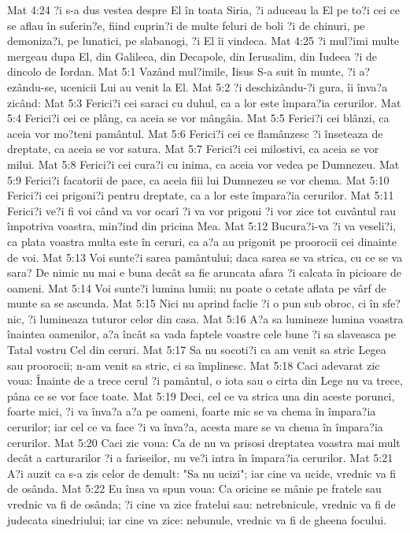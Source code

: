 Mat 4:24  ?i s-a dus vestea despre El în toata Siria, ?i aduceau la El pe to?i cei ce se aflau în suferin?e, fiind cuprin?i de multe feluri de boli ?i de chinuri, pe demoniza?i, pe lunatici, pe slabanogi, ?i El îi vindeca.
Mat 4:25  ?i mul?imi multe mergeau dupa El, din Galileea, din Decapole, din Ierusalim, din Iudeea ?i de dincolo de Iordan.
Mat 5:1  Vazând mul?imile, Iisus S-a suit în munte, ?i a?ezându-se, ucenicii Lui au venit la El.
Mat 5:2  ?i deschizându-?i gura, îi înva?a zicând:
Mat 5:3  Ferici?i cei saraci cu duhul, ca a lor este împara?ia cerurilor.
Mat 5:4  Ferici?i cei ce plâng, ca aceia se vor mângâia.
Mat 5:5  Ferici?i cei blânzi, ca aceia vor mo?teni pamântul.
Mat 5:6  Ferici?i cei ce flamânzesc ?i înseteaza de dreptate, ca aceia se vor satura.
Mat 5:7  Ferici?i cei milostivi, ca aceia se vor milui.
Mat 5:8  Ferici?i cei cura?i cu inima, ca aceia vor vedea pe Dumnezeu.
Mat 5:9  Ferici?i facatorii de pace, ca aceia fiii lui Dumnezeu se vor chema.
Mat 5:10  Ferici?i cei prigoni?i pentru dreptate, ca a lor este împara?ia cerurilor.
Mat 5:11  Ferici?i ve?i fi voi când va vor ocarî ?i va vor prigoni ?i vor zice tot cuvântul rau împotriva voastra, min?ind din pricina Mea.
Mat 5:12  Bucura?i-va ?i va veseli?i, ca plata voastra multa este în ceruri, ca a?a au prigonit pe proorocii cei dinainte de voi.
Mat 5:13  Voi sunte?i sarea pamântului; daca sarea se va strica, cu ce se va sara? De nimic nu mai e buna decât sa fie aruncata afara ?i calcata în picioare de oameni.
Mat 5:14  Voi sunte?i lumina lumii; nu poate o cetate aflata pe vârf de munte sa se ascunda.
Mat 5:15  Nici nu aprind faclie ?i o pun sub obroc, ci în sfe?nic, ?i lumineaza tuturor celor din casa.
Mat 5:16  A?a sa lumineze lumina voastra înaintea oamenilor, a?a încât sa vada faptele voastre cele bune ?i sa slaveasca pe Tatal vostru Cel din ceruri.
Mat 5:17  Sa nu socoti?i ca am venit sa stric Legea sau proorocii; n-am venit sa stric, ci sa împlinesc.
Mat 5:18  Caci adevarat zic voua: Înainte de a trece cerul ?i pamântul, o iota sau o cirta din Lege nu va trece, pâna ce se vor face toate.
Mat 5:19  Deci, cel ce va strica una din aceste porunci, foarte mici, ?i va înva?a a?a pe oameni, foarte mic se va chema în împara?ia cerurilor; iar cel ce va face ?i va înva?a, acesta mare se va chema în împara?ia cerurilor.
Mat 5:20  Caci zic voua: Ca de nu va prisosi dreptatea voastra mai mult decât a carturarilor ?i a fariseilor, nu ve?i intra în împara?ia cerurilor.
Mat 5:21  A?i auzit ca s-a zis celor de demult: "Sa nu ucizi"; iar cine va ucide, vrednic va fi de osânda.
Mat 5:22  Eu însa va spun voua: Ca oricine se mânie pe fratele sau vrednic va fi de osânda; ?i cine va zice fratelui sau: netrebnicule, vrednic va fi de judecata sinedriului; iar cine va zice: nebunule, vrednic va fi de gheena focului.
